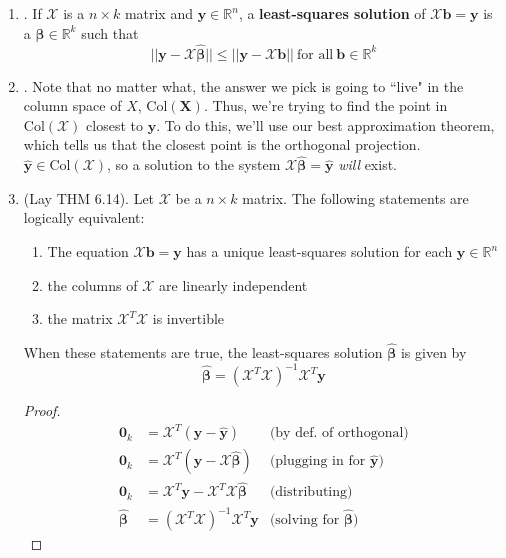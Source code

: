\documentclass[12pt]{article}
\begin{document}
\begin{enumerate}
\begin{enumerate}
	\item\underline{}.
		If $\mathcal{X}$ is a $n\times k$ matrix and $\mathbf{y}\in\mathbb{R}^n$, a \textbf{least-squares solution} of $\mathcal{X}\mathbf{b}=\mathbf{y}$
		is a $\widehat{\boldsymbol{\beta}}\in\mathbb{R}^k$ such that
		\[||\mathbf{y}-\mathcal{X}\widehat{\boldsymbol{\beta}}||\leq ||\mathbf{y}-\mathcal{X}\mathbf{b}|| \ \text{for all} \ \mathbf{b}\in\mathbb{R}^k\]
	
	\item\underline{}.
		Note that no matter what, the answer we pick is going to ``live" in the column space of $X$, $\text{Col}(\mathbf{X})$. Thus, we're
		trying to find the point in $\text{Col}(\mathcal{X})$ closest to $\mathbf{y}$. To do this, we'll use our best approximation theorem,
		which tells us that the closest point is the orthogonal projection. $\hat{\mathbf{y}}\in\text{Col}(\mathcal{X})$, so a solution
		to the system $\mathcal{X}\widehat{\boldsymbol{\beta}}=\hat{\mathbf{y}}$ \emph{will} exist.

	\item\underline{} (Lay THM 6.14).
		Let $\mathcal{X}$ be a $n\times k$ matrix. The following statements are logically equivalent:
		\begin{enumerate}
		\item The equation $\mathcal{X}\mathbf{b}=\mathbf{y}$ has a unique least-squares solution for each $\mathbf{y}\in\mathbb{R}^n$
		\item the columns of $\mathcal{X}$ are linearly independent
		\item the matrix $\mathcal{X}^T\mathcal{X}$ is invertible
		\end{enumerate}
		When these statements are true, the least-squares solution $\hat{\boldsymbol{\beta}}$ is given by
			\[\widehat{\boldsymbol{\beta}}=(\mathcal{X}^T\mathcal{X})^{-1}\mathcal{X}^T\mathbf{y}\]
		\begin{proof}
		\begin{align*}
			\mathbf{0}_k & = \mathcal{X}^T(\mathbf{y}-\hat{\mathbf{y}})
					&\text{(by def. of orthogonal)}\\[5pt]
			\mathbf{0}_k & = \mathcal{X}^T(\mathbf{y}-\mathcal{X}\widehat{\boldsymbol{\beta}})
					&\text{(plugging in for $\hat{\mathbf{y}}$)}\\[5pt]
			\mathbf{0}_k & = \mathcal{X}^T\mathbf{y} - \mathcal{X}^T\mathcal{X}\widehat{\boldsymbol{\beta}}
					&\text{(distributing)}\\[5pt]
			\widehat{\boldsymbol{\beta}}& = (\mathcal{X}^T\mathcal{X})^{-1}\mathcal{X}^T\mathbf{y}
					&\text{(solving for $\widehat{\boldsymbol{\beta}}$)}
		\end{align*}
		\end{proof}
	

\end{enumerate}
\end{enumerate}
\end{document}
